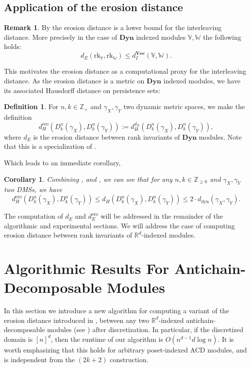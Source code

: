 \documentclass[a4paper,UKenglish,thm-restate]{article}
\newtheorem{corollary}[theorem]{Corollary}
\theoremstyle{definition}
\newtheorem{definition}[theorem]{Definition}
\newtheorem{remark}[theorem]{Remark}
\def\bbv{\mathbb{V}}
\def\bbw{\mathbb{W}}
\def\bdyn{\mathbf{Dyn}}
\def\bvec{\mathbf{Vec}}
\begin{document}
    \subsection{Application of the erosion distance}
        \begin{remark}\label{rem:erosionlowerboundsinterleaving}
            By \cite[Theorem 8.2]{patelerosion} the erosion distance is a lower bound for the interleaving distance. More precisely in the case of $\bdyn$ indexed modules $\bbv, \bbw$ the following holds: \[d_E(\mathrm{rk}_\bbv, \mathrm{rk}_\bbw) \leq d_I^{\bvec}(\bbv, \bbw).\]
        \end{remark}
        This motivates the erosion distance as a computational proxy for the interleaving distance. As the erosion distance is a metric on $\bdyn$ indexed modules, we have its associated Hausdorff distance on persistence sets:
        \begin{definition}\label{def:persistenceseterosion}
            For $n, k \in \mathbb{Z}_+$ and $\gamma_X, \gamma_Y$ two dynamic metric spaces, we make the definition \[d_H^{\mathrm{ero}}(D^n_k(\gamma_X), D^n_k(\gamma_Y)) := d_H^{d_E}(D^n_k(\gamma_X), D^n_k(\gamma_Y)),\] where $d_E$ is the erosion distance between rank invariants of $\bdyn$ modules. Note that this is a specialization of .
        \end{definition}
        Which leads to an immediate corollary,
        \begin{corollary} \label{cor:dEhausdorffstable}
            Combining ,  and , we can see that for any $n, k \in \mathbb{Z}_{\geq 0}$ and $\gamma_X, \gamma_Y$ two DMSs, we have \[d_H^{\mathrm{ero}}(D^n_k(\gamma_X), D^n_k(\gamma_Y)) \leq d_H(D^n_k(\gamma_X), D^n_k(\gamma_Y)) \leq 2 \cdot d_{\mathrm{dyn}}(\gamma_X, \gamma_Y).\]
        \end{corollary}
        The computation of $d_E$ and $d_E^{\mathrm{ero}}$ will be addressed in the remainder of the algorithmic and experimental sections. We will address the case of computing erosion distance between rank invariants of $\mathbb{R}^d$-indexed modules.

\section{Algorithmic Results For Antichain-Decomposable Modules}

    In this section we introduce a new algorithm for computing a variant of the erosion distance introduced in \cite{patelerosion}, between any two $\mathbb{R}^d$-indexed antichain-decomposable modules (see ) after discretization. In particular, if the discretized domain is $[n]^d$, then the runtime of our algorithm is $O(n^{d-1} d \log{n})$. It is worth emphasizing that this holds for arbitrary poset-indexed ACD modules, and is independent from the $(2k+2)$ construction.
\end{document}
